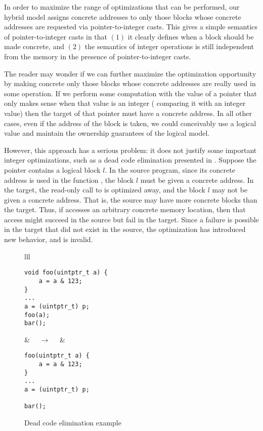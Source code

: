 In order to maximize the range of optimizations that can be performed, our hybrid model assigns
concrete addresses to only those blocks whose concrete addresses are requested via
pointer-to-integer casts.  This gives a simple semantics of pointer-to-integer casts in that $(1)$
it clearly defines when a block should be made concrete, and $(2)$ the semantics of integer
operations is still independent from the memory in the presence of pointer-to-integer casts.

The reader may wonder if we can further maximize the optimization opportunity by making concrete
only those blocks whose concrete addresses are really used in some operation.  If we perform some
computation with the value of a pointer that only makes sense when that value is an integer
(\eg %
comparing it with an integer value) then the target of that pointer must have a concrete address.
In all other cases, even if the address of the block is taken, we could conceivably use a logical
value and maintain the ownership guarantees of the logical model.

However, this approach has a serious problem: it does not justify some important integer
optimizations, such as a dead code elimination presented in
.  Suppose the pointer  contains a logical block
$l$. In the source program, since its concrete address is used in the function , the block
$l$ must be given a concrete address. In the target, the read-only call to  is optimized
away, and the block $l$ may not be given a concrete address. That is, the source may have more
concrete blocks than the target. Thus, if  accesses an arbitrary concrete memory
location, then that access might succeed in the source but fail in the target. Since a failure is
possible in the target that did not exist in the source, the optimization has introduced new
behavior, and is invalid.

\begin{figure}[t]
\small
\center
\begin{tabular}{lll}
\begin{minipage}{0.3\textwidth}
\begin{verbatim}
void foo(uintptr_t a) {
    a = a & 123;
}
...
a = (uintptr_t) p;
foo(a);
bar();
\end{verbatim}
\end{minipage}
&
$\quad\rightarrow\quad$
&
\begin{minipage}{0.3\textwidth}
\begin{verbatim}
foo(uintptr_t a) {
    a = a & 123;
}
...
a = (uintptr_t) p;

bar();
\end{verbatim}
\end{minipage}
\end{tabular}
\caption{Dead code elimination example}
\label{fig:intptrcast:formal-semantics:dce}
\end{figure}


